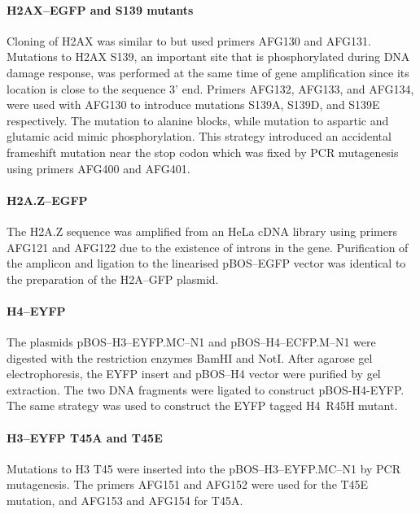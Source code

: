     \paragraph{H2AX--EGFP and S139 mutants}
      Cloning of H2AX was similar to  but used primers AFG130 and AFG131.
      Mutations to H2AX S139, an important site that is phosphorylated during
      DNA damage response, was performed at the same time of gene amplification
      since its location is close to the sequence 3' end. Primers AFG132, AFG133, and AFG134,
      were used with AFG130 to introduce mutations S139A, S139D, and S139E respectively.
      The mutation to alanine blocks, while mutation to aspartic and glutamic acid
      mimic phosphorylation. This strategy introduced an accidental frameshift mutation
      near the stop codon which was fixed by PCR mutagenesis using primers AFG400
      and AFG401.

    \paragraph{H2A.Z--EGFP}
      The H2A.Z sequence was amplified from an HeLa cDNA library
      using primers AFG121 and AFG122
      due to the existence of introns in the  gene.
      Purification of the amplicon and ligation to the linearised pBOS--EGFP vector
      was identical to the preparation of the H2A--GFP plasmid.

    \paragraph{H4--EYFP}
      The plasmids pBOS--H3--EYFP.MC--N1 and pBOS--H4--ECFP.M--N1 were
      digested with the restriction enzymes BamHI and NotI. After agarose
      gel electrophoresis, the EYFP insert and pBOS--H4 vector were purified
      by gel extraction. The two DNA fragments were ligated to construct
      pBOS-H4-EYFP. The same strategy was used to construct the EYFP tagged
      H4~R45H mutant.

    \paragraph{H3--EYFP T45A and T45E}
      Mutations to H3 T45 were inserted into the pBOS--H3--EYFP.MC--N1 by
      PCR mutagenesis. The primers AFG151 and AFG152 were used for the
      T45E mutation, and AFG153 and AFG154 for T45A.


